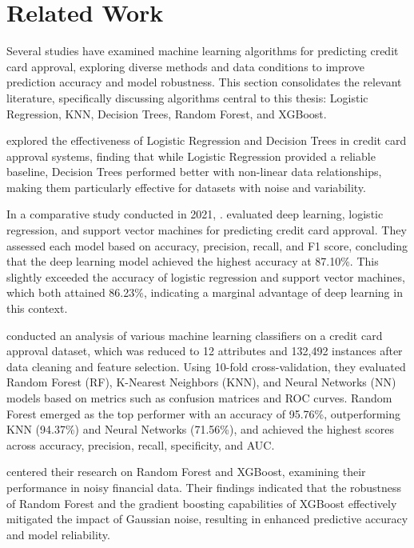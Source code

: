 \documentclass[12pt]{report}
\begin{document}
    \chapter{Related Work}
    Several studies have examined machine learning algorithms for predicting credit card approval, exploring diverse methods and data conditions to improve prediction accuracy and model robustness. This section consolidates the relevant literature, specifically discussing algorithms central to this thesis: Logistic Regression, KNN, Decision Trees, Random Forest, and XGBoost.

     explored the effectiveness of Logistic Regression and Decision Trees in credit card approval systems, finding that while Logistic Regression provided a reliable baseline, Decision Trees performed better with non-linear data relationships, making them particularly effective for datasets with noise and variability.

    In a comparative study conducted in 2021, \citeauthor{Kibria2021Application}. evaluated deep learning, logistic regression, and support vector machines for predicting credit card approval. They assessed each model based on accuracy, precision, recall, and F1 score, concluding that the deep learning model achieved the highest accuracy at 87.10\%. This slightly exceeded the accuracy of logistic regression and support vector machines, which both attained 86.23\%, indicating a marginal advantage of deep learning in this context.

     conducted an analysis of various machine learning classifiers on a credit card approval dataset, which was reduced to 12 attributes and 132,492 instances after data cleaning and feature selection. Using 10-fold cross-validation, they evaluated Random Forest (RF), K-Nearest Neighbors (KNN), and Neural Networks (NN) models based on metrics such as confusion matrices and ROC curves. Random Forest emerged as the top performer with an accuracy of 95.76\%, outperforming KNN (94.37\%) and Neural Networks (71.56\%), and achieved the highest scores across accuracy, precision, recall, specificity, and AUC.

     centered their research on Random Forest and XGBoost, examining their performance in noisy financial data. Their findings indicated that the robustness of Random Forest and the gradient boosting capabilities of XGBoost effectively mitigated the impact of Gaussian noise, resulting in enhanced predictive accuracy and model reliability.
\end{document}
